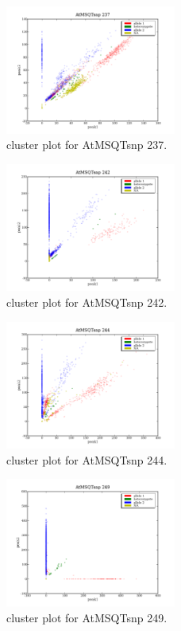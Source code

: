 \begin{figure}[H]
\includegraphics[width=0.5\textwidth]{figures/cluster_plot_AtMSQTsnp_237.png}
\caption{cluster plot for AtMSQTsnp 237.} \label{flAtMSQTsnp237}
\end{figure}

\begin{figure}[H]
\includegraphics[width=0.5\textwidth]{figures/cluster_plot_AtMSQTsnp_242.png}
\caption{cluster plot for AtMSQTsnp 242.} \label{flAtMSQTsnp242}
\end{figure}

\begin{figure}[H]
\includegraphics[width=0.5\textwidth]{figures/cluster_plot_AtMSQTsnp_244.png}
\caption{cluster plot for AtMSQTsnp 244.} \label{flAtMSQTsnp244}
\end{figure}

\begin{figure}[H]
\includegraphics[width=0.5\textwidth]{figures/cluster_plot_AtMSQTsnp_249.png}
\caption{cluster plot for AtMSQTsnp 249.} \label{flAtMSQTsnp249}
\end{figure}

